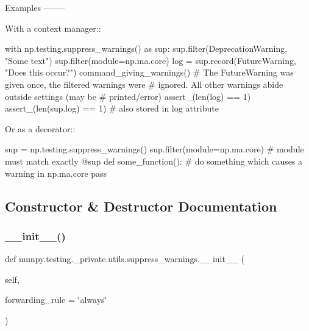 \begin{DoxyVerb}
Examples
--------

With a context manager::

    with np.testing.suppress_warnings() as sup:
        sup.filter(DeprecationWarning, "Some text")
        sup.filter(module=np.ma.core)
        log = sup.record(FutureWarning, "Does this occur?")
        command_giving_warnings()
        # The FutureWarning was given once, the filtered warnings were
        # ignored. All other warnings abide outside settings (may be
        # printed/error)
        assert_(len(log) == 1)
        assert_(len(sup.log) == 1)  # also stored in log attribute

Or as a decorator::

    sup = np.testing.suppress_warnings()
    sup.filter(module=np.ma.core)  # module must match exactly
    @sup
    def some_function():
        # do something which causes a warning in np.ma.core
        pass
\end{DoxyVerb}
 

\subsection{Constructor \& Destructor Documentation}
\mbox{\label{classnumpy_1_1testing_1_1__private_1_1utils_1_1suppress__warnings_a48996d020ba499a43550a87e9320fed2}} 
\subsubsection{\texorpdfstring{\+\_\+\+\_\+init\+\_\+\+\_\+()}{\_\_init\_\_()}}
{\footnotesize\ttfamily def numpy.\+testing.\+\_\+private.\+utils.\+suppress\+\_\+warnings.\+\_\+\+\_\+init\+\_\+\+\_\+ (\begin{DoxyParamCaption}\item[{}]{self,  }\item[{}]{forwarding\+\_\+rule = {\ttfamily \char`\"{}always\char`\"{}} }\end{DoxyParamCaption})}



